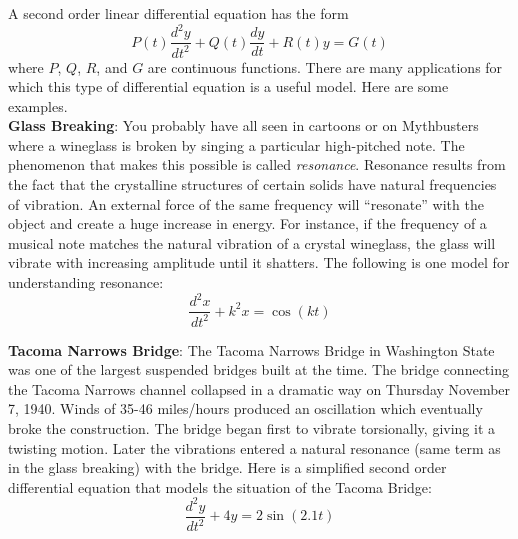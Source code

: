 \pagestyle{fancy}
\renewcommand{\theUnit}{4.2}
\ifthenelse{\isundefined{\UnitPageNumbers}}{}{\setcounter{page}{1}}
\rhead{Section \theUnit: Second Order Linear DEs}
\rfoot{\mypage}
\lfoot{}
\cfoot{}
\renewcommand{\footrulewidth}{.4pt}
\vspace*{-20pt} \thispagestyle{firstfooter}

A second order linear differential equation has the form
\[
P(t)\frac{d^2y}{dt^2}+Q(t)\frac{dy}{dt}+R(t)y=G(t)
\]
where $P$, $Q$, $R$, and $G$ are continuous functions. There are many applications for which this type of differential equation is a useful model. %
Here are some examples. \\

\textbf{Glass Breaking}: You probably have all seen in cartoons or on Mythbusters where a wineglass is broken by singing a particular high-pitched note. The phenomenon that makes this possible is called \textit{resonance}. Resonance results from the fact that the crystalline structures of certain solids have natural frequencies of vibration. An external force of the same frequency will ``resonate'' with the object and create a huge increase in energy. For instance, if the frequency of a musical note matches the natural vibration of a crystal wineglass, the glass will vibrate with increasing amplitude until it shatters. The following is one model for understanding resonance: 
\[
\frac{d^2x}{dt^2}+k^2x=\cos(kt)
\]

\textbf{Tacoma Narrows Bridge}: The Tacoma Narrows Bridge in Washington State was one of the largest suspended bridges built at the time. The bridge connecting the Tacoma Narrows channel collapsed in a dramatic way on Thursday November 7, 1940. Winds of 35-46 miles/hours produced an oscillation which eventually broke the construction. The bridge began first to vibrate torsionally, giving it a twisting motion. Later the vibrations entered a natural resonance (same term as in the glass breaking) with the bridge. Here is a simplified second order differential equation that models the situation of the Tacoma Bridge:
\[
\frac{d^2y}{dt^2}+4y=2\sin(2.1t)
\]

